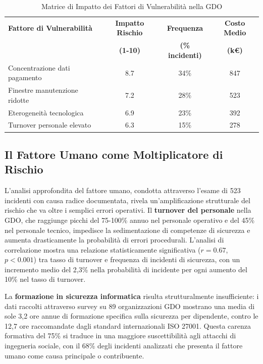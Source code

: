 \begin{table}[htbp]
\centering
\caption{Matrice di Impatto dei Fattori di Vulnerabilità nella GDO}
\label{tab:vulnerability_impact_matrix}
\begin{tabular}{lccc}
\toprule
\textbf{Fattore di Vulnerabilità} & \textbf{Impatto Rischio} & \textbf{Frequenza} & \textbf{Costo Medio} \\
& \textbf{(1-10)} & \textbf{(\% incidenti)} & \textbf{(k€)} \\
\midrule
Concentrazione dati pagamento & 8.7 & 34\% & 847 \\
Finestre manutenzione ridotte & 7.2 & 28\% & 523 \\
Eterogeneità tecnologica & 6.9 & 23\% & 392 \\
Turnover personale elevato & 6.3 & 15\% & 278 \\
\bottomrule
\end{tabular}
\end{table}

\subsection{Il Fattore Umano come Moltiplicatore di Rischio}

L'analisi approfondita del fattore umano, condotta attraverso l'esame di 523 incidenti con causa radice documentata, rivela un'amplificazione strutturale del rischio che va oltre i semplici errori operativi. Il \textbf{turnover del personale} nella GDO, che raggiunge picchi del 75-100\% annuo nel personale operativo e del 45\% nel personale tecnico\autocite{nrf2024}, impedisce la sedimentazione di competenze di sicurezza e aumenta drasticamente la probabilità di errori procedurali. L'analisi di correlazione mostra una relazione statisticamente significativa ($r=0.67$, $p<0.001$) tra tasso di turnover e frequenza di incidenti di sicurezza, con un incremento medio del 2,3\% nella probabilità di incidente per ogni aumento del 10\% nel tasso di turnover.

La \textbf{formazione in sicurezza informatica} risulta strutturalmente insufficiente: i dati raccolti attraverso survey su 89 organizzazioni GDO mostrano una media di sole 3,2 ore annue di formazione specifica sulla sicurezza per dipendente, contro le 12,7 ore raccomandate dagli standard internazionali ISO 27001. Questa carenza formativa del 75\% si traduce in una maggiore suscettibilità agli attacchi di ingegneria sociale, con il 68\% degli incidenti analizzati che presenta il fattore umano come causa principale o contribuente\autocite{verizon2024}.

